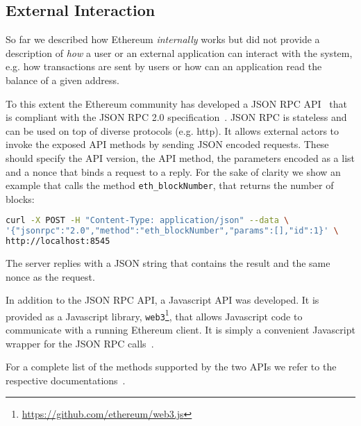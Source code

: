 \subsection{External Interaction}

So far we described how Ethereum \emph{internally} works but did not provide
a description of \emph{how} a user or an external application can interact with 
the system, e.g. how transactions are sent by users or how can an application
read the balance of a given address.

To this extent the Ethereum community has developed a JSON RPC
API~\cite{bib:json-rpc} that is compliant with the
JSON RPC 2.0 specification~\cite{bib:json2012json}.
JSON RPC is stateless and can be used on top of diverse protocols (e.g. http).
It allows external actors to invoke the exposed API methods by sending
JSON encoded requests. These should specify the
API version, the API method, the parameters encoded as a list and a nonce
that binds a request to a reply.
For the sake of clarity we show an example that calls the method 
\verb|eth_blockNumber|, that returns the number of blocks:

\begin{lstlisting}[language=bash]
curl -X POST -H "Content-Type: application/json" --data \
'{"jsonrpc":"2.0","method":"eth_blockNumber","params":[],"id":1}' \
http://localhost:8545
\end{lstlisting} 
The server replies with a JSON string that contains the result and the same
nonce as the request.




In addition to the JSON RPC API, a Javascript API was developed. It is provided
as a Javascript library, 
\texttt{web3}\footnote{\url{https://github.com/ethereum/web3.js}}, that allows
Javascript code to
communicate with a running Ethereum client. It is simply a convenient
Javascript wrapper for the JSON RPC calls~\cite{bib:javascript-api}.

For a complete list of the methods supported by the two APIs we refer to the
respective documentations~\cite{bib:json-rpc, bib:javascript-api}. 


